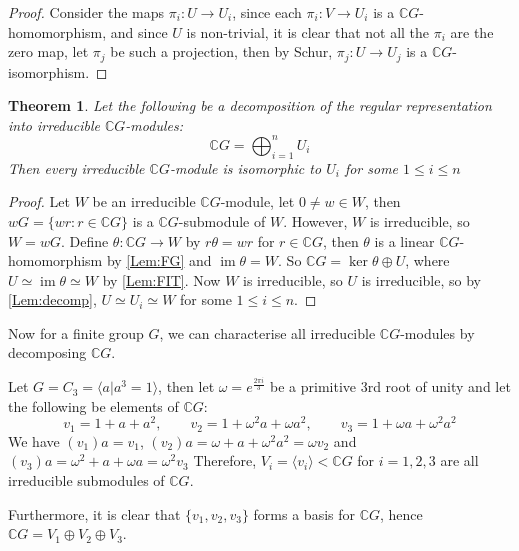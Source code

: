 \documentclass[11pt, notitlepage]{article}
\numberwithin{equation}{section}
\theoremstyle{plain}
\newtheorem{theorem}{Theorem}[section]
\theoremstyle{definition}
\newenvironment{example}
	{\pushQED{\qed}\renewcommand{\qedsymbol}{$\blacktriangleleft$}\examplex}
	{\popQED\endexamplex}
\newcommand{\CG}{{\mathbb{C}G}}
\DeclareMathOperator{\im}{im}
\begin{document}
\begin{proof}
	Consider the maps $\pi_i:U\rightarrow U_i$, since each $\pi_i:V\rightarrow U_i$ is a $\CG$-homomorphism, and since $U$ is non-trivial, it is clear that not all the $\pi_i$ are the zero map, let $\pi_j$ be such a projection, then by Schur, $\pi_j:U\rightarrow U_j$ is a $\CG$-isomorphism.
\end{proof}
\begin{theorem}
	Let the following be a decomposition of the regular representation into irreducible $\CG$-modules:
	\[
	\CG = \bigoplus_{i = 1}^n U_i
	\]
	Then every irreducible $\CG$-module is isomorphic to $U_i$ for some $1\leq i\leq n$
\end{theorem}
\begin{proof}
	Let $W$ be an irreducible $\CG$-module, let $0\neq w\in W$, then $wG = \{wr:r\in \CG\}$ is a $\CG$-submodule of $W$. However, $W$ is irreducible, so $W=wG$. Define $\theta:\CG\rightarrow W$ by $r\theta = wr$ for $r\in \CG$, then $\theta$ is a linear $\CG$-homomorphism by \ref{Lem:FG} and $\im\theta=W$. So $\CG = \ker\theta\oplus U$, where $U\simeq \im \theta\simeq W$ by \ref{Lem:FIT}. Now $W$ is irreducible, so $U$ is irreducible, so by \ref{Lem:decomp}, $U\simeq U_i\simeq W$ for some $1\leq i\leq n$.
\end{proof}

Now for a finite group $G$, we can characterise all irreducible $\CG$-modules by decomposing $\CG$.

\begin{example}
	Let $G = C_3 = \langle a|a^3=1\rangle$, then let $\omega = e^{\frac{2\pi i}{3}}$ be a primitive 3rd root of unity and let the following be elements of $\CG$:
	\[
	v_1 = 1+a+a^2,\qquad v_2 = 1+\omega^2 a+\omega a^2,\qquad v_3 = 1+\omega a +\omega^2 a^2
	\]
	We have $(v_1)a = v_1$, $(v_2)a = \omega+a+\omega^2a^2=\omega v_2$ and $(v_3)a = \omega^2+a+\omega a = \omega^2v_3$
	Therefore, $V_i = \langle v_i\rangle<\CG$ for $i=1,2,3$ are all irreducible submodules of $\CG$.
	
	Furthermore, it is clear that $\{v_1,v_2,v_3\}$ forms a basis for $\CG$, hence $\CG=V_1\oplus V_2\oplus V_3$.
\end{example}
\end{document}
